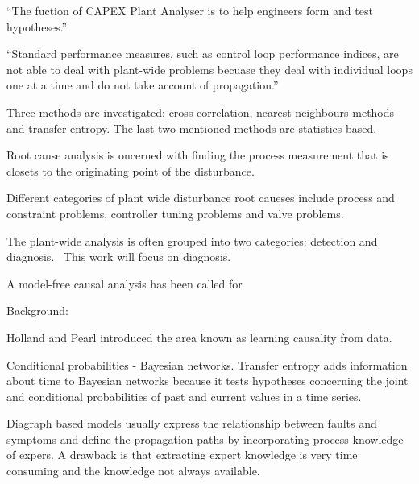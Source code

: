 ``The fuction of CAPEX Plant Analyser is to help engineers form and test hypotheses.''~\cite{Yim2006}

``Standard performance measures, such as control loop performance indices, are not able to deal with plant-wide problems becuase they deal with individual loops one at a time and do not take account of propagation.''~\cite{Bauer2008}



Three methods are investigated: cross-correlation, nearest neighbours methods and transfer entropy.
The last two mentioned methods are statistics based.

Root cause analysis is oncerned with finding the process measurement that is closets to the originating point of the disturbance.

Different categories of plant wide disturbance root caueses include process and constraint problems, controller tuning problems and valve problems. %






The plant-wide analysis is often grouped into two categories: detection and diagnosis.~\cite{Bauer2008} %
This work will focus on diagnosis.

A model-free causal analysis has been called for~\cite{Bauer2008} %

Background:

Holland and Pearl introduced the area known as learning causality from data.

Conditional probabilities - Bayesian networks.
Transfer entropy adds information about time to Bayesian networks because it tests hypotheses concerning the joint and conditional probabilities of past and current values in a time series.






Diagraph based models usually express the relationship between faults and symptoms and define the propagation paths by incorporating process knowledge of expers.
A drawback is that extracting expert knowledge is very time consuming and the knowledge not always available.

